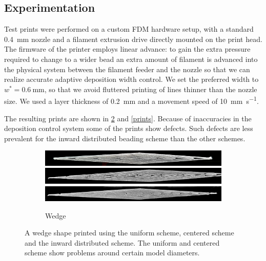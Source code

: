 \subsection{Experimentation}
Test prints were performed on a custom FDM hardware setup, with a standard \SI{0.4}{\milli\meter} nozzle and a filament extrusion drive directly mounted on the print head.
The firmware of the printer employs linear advance: to gain the extra pressure required to change to a wider bead an extra amount of filament is advanced into the physical system between the filament feeder and the nozzle so that we can realize accurate adaptive deposition width control.\cite{tronvoll2019investigating}
We set the preferred width to $w^* = \SI{0.6}{\milli\meter}$, so that we avoid fluttered printing of lines thinner than the nozzle size.
We used a layer thickness of \SI{0.2}{\milli\meter} and a movement speed of \SI{10}{\milli\meter\per\second}.

The resulting prints are shown in \cref{wedge_print} and \cref{prints}.
Because of inaccuracies in the deposition control system some of the prints show defects.
Such defects are less prevalent for the inward distributed beading scheme than the other schemes.


\begin{figure}
\centering
\begin{subfigure}{\columnwidth}\centering
\setlength{\figwidth}{\columnwidth}
\includegraphics[width=\figwidth]{sources/applications/P3_print_wedge_naive_edited.png}
\includegraphics[width=\figwidth]{sources/applications/P3_print_wedge_center_edited.png}
\includegraphics[width=\figwidth]{sources/applications/P3_print_wedge_inward_edited.png}
\caption{Wedge}\label{print_wedge}
\end{subfigure}
\caption{
A wedge shape printed using the uniform scheme, centered scheme and the inward distributed scheme.
The uniform and centered scheme show problems around certain model diameters.
}
\label{wedge_print}
\end{figure}

